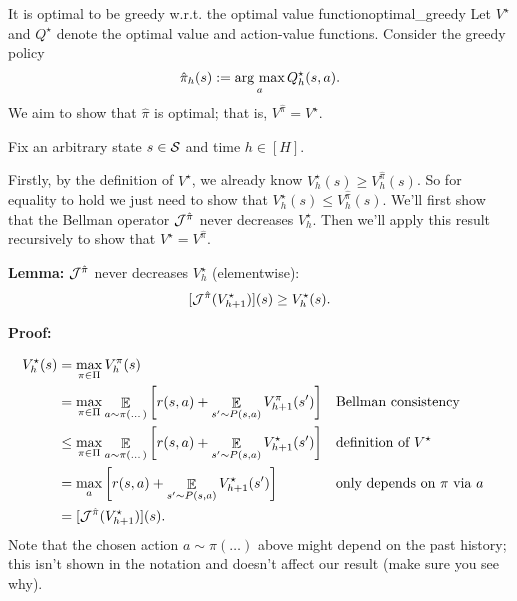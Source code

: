\documentclass[\main/main]{subfiles}
\begin{document}
\begin{theorem}{It is optimal to be greedy w.r.t. the optimal value function}{optimal_greedy}
    Let $V^{\star}$ and $Q^{\star}$ denote the optimal value and action-value functions. Consider the greedy policy
    \[
        \hat \pi_h(s) := \argmax_a Q_h^{\star}(s, a).
    \]
    We aim to show that $\hat \pi$ is optimal; that is, $V^{\hat \pi} = V^{\star}$.

    Fix an arbitrary state $s \in \S$ and time $h \in [H]$.

    Firstly, by the definition of $V^{\star}$, we already know $V_h^{\star}(s) \ge V_h^{\hat \pi}(s)$. So for equality to hold we just need to show that $V_h^{\star}(s) \le V_h^{\hat \pi}(s)$. We'll first show that the Bellman operator $\bop^{\hat \pi}$ never decreases $V_h^{\star}$. Then we'll apply this result recursively to show that $V^{\star} = V^{\hat \pi}$.
    
    \textbf{Lemma:} $\bop^{\hat \pi}$ never decreases $V_h^{\star}$ (elementwise):
    \[
        [\bop^{\hat \pi} (V_{h+1}^{\star})](s) \ge V_h^{\star}(s).
    \]
    
    \textbf{Proof:}
    
    \begin{align*}
    V_h^{\star}(s) &= \max_{\pi \in \Pi} V_h^{\pi}(s) \\
    &= \max_{\pi \in \Pi} \mathop{\mathbb{E}}_{a \sim \pi(\dots)}\left[r(s, a) + \mathop{\mathbb{E}}_{s' \sim P(s, a)} V_{h+1}^\pi(s') \right] && \text{Bellman consistency} \\
    &\le \max_{\pi \in \Pi} \mathop{\mathbb{E}}_{a \sim \pi(\dots)}\left[r(s, a) + \mathop{\mathbb{E}}_{s' \sim P(s, a)} V_{h+1}^{\star}(s') \right] && \text{definition of } V^\star \\
    &= \max_{a} \left[ r(s, a) + \mathop{\mathbb{E}}_{s' \sim P(s, a)} V_{h+1}^{\star}(s') \right] && \text{only depends on } \pi \text{ via } a \\
    &= [\bop^{\hat \pi}(V_{h+1}^{\star})](s).
    \end{align*}
    Note that the chosen action $a \sim \pi(\dots)$ above might depend on the past history; this isn't shown in the notation and doesn't affect our result (make sure you see why).
    

\end{theorem}
\end{document}
